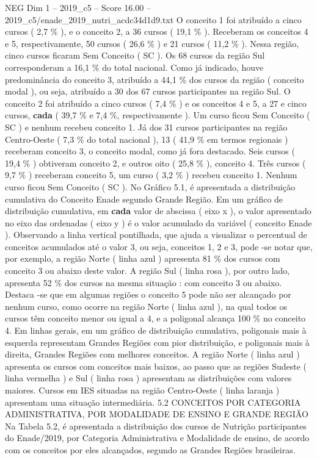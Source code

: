 \begin{textsample}{NEG Dim 1 – 2019\_c5 – Score 16.00 – 2019\_c5/enade\_2019\_nutri\_acdc34d1d9.txt}
O conceito 1 foi atribuído a cinco cursos ( 2,7 \% ), e o conceito 2, a 36 cursos ( 19,1 \% ).
Receberam os conceitos 4 e 5, respectivamente, 50 cursos ( 26,6 \% ) e 21 cursos ( 11,2 \% ).
Nessa região, cinco cursos ficaram Sem Conceito ( SC ).
Os 68 cursos da região Sul corresponderam a 16,1 \% do total nacional.
Como já indicado, houve predominância do conceito 3, atribuído a 44,1 \% dos cursos da região ( conceito modal ), ou seja, atribuído a 30 dos 67 cursos participantes na região Sul.
O conceito 2 foi atribuído a cinco cursos ( 7,4 \% ) e os conceitos 4 e 5, a 27 e cinco cursos, \textbf{cada} ( 39,7 \% e 7,4 \%, respectivamente ).
Um curso ficou Sem Conceito ( SC ) e nenhum recebeu conceito 1.
Já dos 31 cursos participantes na região Centro-Oeste ( 7,3 \% do total nacional ), 13 ( 41,9 \% em termos regionais ) receberam conceito 3, o conceito modal, como já fora destacado.
Seis cursos ( 19,4 \% ) obtiveram conceito 2, e outros oito ( 25,8 \% ), conceito 4.
Três cursos ( 9,7 \% ) receberam conceito 5, um curso ( 3,2 \% ) recebeu conceito 1.
Nenhum curso ficou Sem Conceito ( SC ).
No Gráfico 5.1, é apresentada a distribuição cumulativa do Conceito Enade segundo Grande Região.
Em um gráfico de distribuição cumulativa, em \textbf{cada} valor de abscissa ( eixo x ), o valor apresentado no eixo das ordenadas ( eixo y ) é o valor acumulado da variável ( conceito Enade ).
Observando a linha vertical pontilhada, que ajuda a visualizar o percentual de conceitos acumulados até o valor 3, ou seja, conceitos 1, 2 e 3, pode -se notar que, por exemplo, a região Norte ( linha azul ) apresenta 81 \% dos cursos com conceito 3 ou abaixo deste valor.
A região Sul ( linha rosa ), por outro lado, apresenta 52 \% dos cursos na mesma situação : com conceito 3 ou abaixo.
Destaca -se que em algumas regiões o conceito 5 pode não ser alcançado por nenhum curso, como ocorre na região Norte ( linha azul ), na qual todos os cursos têm conceito menor ou igual a 4, e a poligonal alcança 100 \% no conceito 4.
Em linhas gerais, em um gráfico de distribuição cumulativa, poligonais mais à esquerda representam Grandes Regiões com pior distribuição, e poligonais mais à direita, Grandes Regiões com melhores conceitos.
A região Norte ( linha azul ) apresenta os cursos com conceitos mais baixos, ao passo que as regiões Sudeste ( linha vermelha ) e Sul ( linha rosa ) apresentam as distribuições com valores maiores.
Cursos em IES situadas na região Centro-Oeste ( linha laranja ) apresentam uma situação intermediária. 5.2 CONCEITOS POR CATEGORIA ADMINISTRATIVA, POR MODALIDADE DE ENSINO E GRANDE REGIÃO Na Tabela 5.2, é apresentada a distribuição dos cursos de Nutrição participantes do Enade/2019, por Categoria Administrativa e Modalidade de ensino, de acordo com os conceitos por eles alcançados, segundo as Grandes Regiões brasileiras.

\end{textsample}
